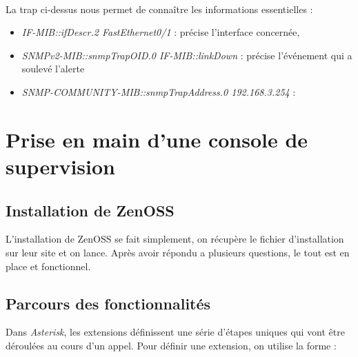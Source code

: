 \documentclass[12pt,a4paper,notitlepage]{article}
\begin{document}
\paragraph{} La trap ci-dessus nous permet de connaître les informations essentielles :
\begin{itemize}
\item \textit{IF-MIB::ifDescr.2 FastEthernet0/1} : précise l'interface concernée,
\item \textit{SNMPv2-MIB::snmpTrapOID.0 IF-MIB::linkDown} : précise l'événement qui a soulevé l'alerte
\item \textit{SNMP-COMMUNITY-MIB::snmpTrapAddress.0 192.168.3.254} :
\end{itemize}


\section{Prise en main d'une console de supervision}
\subsection{Installation de ZenOSS}
L'installation de ZenOSS se fait simplement, on récupère le fichier d'installation sur leur site et on lance. Après avoir répondu a plusieurs questions, le tout est en place et fonctionnel. \\


\subsection{Parcours des fonctionnalités}

Dans \textit{Asterisk}, les extensions définissent une série d'étapes uniques qui vont être déroulées au cours d'un appel. Pour définir une extension, on utilise la forme : \\

\end{document}
